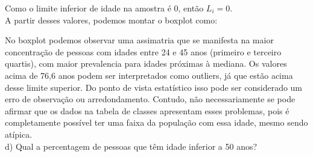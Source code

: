 Como o limite inferior de idade na amostra é $0$, então $L_i=0$.
\\

A partir desses valores, podemos montar o boxplot como:



No boxplot podemos observar uma assimatria que se manifesta na maior concentração de pessoas com idades entre 24 e 45 anos (primeiro e terceiro quartis), com maior prevalencia para idades próximas à mediana. Os valores acima de 76,6 anos podem ser interpretados como outliers, já que estão acima desse limite superior. Do ponto de vista estatístico isso pode ser considerado um erro de observação ou arredondamento. Contudo, não necessariamente se pode afirmar que os dados na tabela de classes apresentam esses problemas, pois é completamente possível ter uma faixa da população com essa idade, mesmo sendo atípica.
\\

d) Qual a percentagem de pessoas que têm idade inferior a 50 anos?